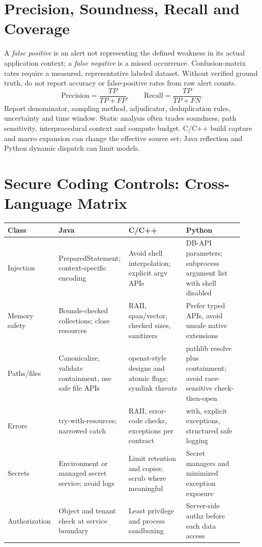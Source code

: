 \documentclass[10pt,letterpaper]{article}
\begin{document}
\section{Precision, Soundness, Recall and Coverage}
A \emph{false positive} is an alert not representing the defined weakness in its actual application context; a \emph{false negative} is a missed occurrence. Confusion-matrix rates require a measured, representative labeled dataset. Without verified ground truth, do not report accuracy or false-positive rates from raw alert counts.
\[\mathrm{Precision}=\frac{TP}{TP+FP},\qquad \mathrm{Recall}=\frac{TP}{TP+FN}.\]
Report denominator, sampling method, adjudicator, deduplication rules, uncertainty and time window. Static analysis often trades soundness, path sensitivity, interprocedural context and compute budget. C/C++ build capture and macro expansion can change the effective source set; Java reflection and Python dynamic dispatch can limit models.
\section{Secure Coding Controls: Cross-Language Matrix}
\small
\begin{longtable}{@{}p{0.20\linewidth}p{0.24\linewidth}p{0.24\linewidth}p{0.24\linewidth}@{}}\toprule
Class & Java & C/C++ & Python\\\midrule\endhead
Injection & PreparedStatement; context-specific encoding & Avoid shell interpolation; explicit argv APIs & DB-API parameters; subprocess argument list with shell disabled\\
Memory safety & Bounds-checked collections; close resources & RAII, span/vector, checked sizes, sanitizers & Prefer typed APIs, avoid unsafe native extensions\\
Paths/files & Canonicalize, validate containment, use safe file APIs & openat-style designs and atomic flags; symlink threats & pathlib resolve plus containment; avoid race-sensitive check-then-open\\
Errors & try-with-resources; narrowed catch & RAII, error-code checks, exceptions per contract & with, explicit exceptions, structured safe logging\\
Secrets & Environment or managed secret service; avoid logs & Limit retention and copies; scrub where meaningful & Secret managers and minimized exception exposure\\
Authorization & Object and tenant check at service boundary & Least privilege and process sandboxing & Server-side authz before each data access\\\bottomrule
\end{longtable}
\normalsize
\end{document}

